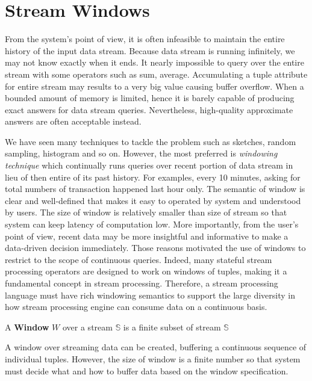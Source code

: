    
    
    
\section{Stream Windows}

From the system's point of view, it is often infeasible to maintain the entire history of the input data stream. Because data stream is running infinitely, we may not know exactly when it ends. It nearly impossible to query over the entire stream with some operators such as sum, average. Accumulating a tuple attribute for entire stream may results to a very big value causing  buffer overflow.  When a bounded amount of memory is limited, hence it is barely capable of producing exact answers for data stream queries. Nevertheless, high-quality approximate answers are often acceptable instead. 

We have seen many techniques to tackle the problem such as sketches, random sampling, histogram and so on. However, the most preferred is \textit{windowing technique} which continually runs queries over recent portion of data stream  in lieu of then entire of its past history. For examples, every 10 minutes, asking for total numbers of transaction happened last hour only. The semantic of window is clear and well-defined that makes it easy to operated by system and understood by users. The size of window is relatively smaller than size of stream so that system can keep latency of computation low.  More importantly, from the user's point of view, recent data may be more insightful and informative to make a data-driven decision immediately. Those reasons motivated the use of windows to restrict to the scope of continuous queries. Indeed, many stateful stream processing operators are designed to work on windows of tuples, making it a fundamental concept in stream processing. Therefore, a stream processing language must have rich windowing semantics to support the large diversity in how stream processing engine can consume data on a continuous basis.


\begin{defi}
A \textbf{Window} $W$ \cite{Dindar:2013} over a stream $\mathbb{S}$ is a finite subset of stream $\mathbb{S}$ 
\end{defi}


A window over streaming data can be created, buffering a continuous sequence of individual tuples. However, the size of window is a finite number so that system must decide what and how to buffer data based on the window specification. 

